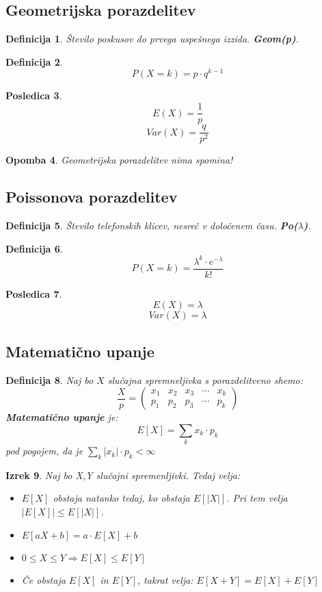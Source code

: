 \documentclass[11pt]{article}
\newtheorem{Izrek}{{\sc Izrek}}[section]
\newtheorem{Posledica}[Izrek]{{\sc Posledica}}
\newtheorem{Definicija}[Izrek]{{\sc Definicija}}
\newtheorem{Opomba}[Izrek]{{\sc Opomba}}
\begin{document}
	\subsection{Geometrijska porazdelitev}
	\begin{Definicija}
		Število poskusov do prvega uspešnega izzida. \textbf{Geom(p)}.
	\end{Definicija}
	\begin{Definicija}
		$$P(X=k) = p \cdot q^{k-1}$$
	\end{Definicija}
	\begin{Posledica}
		$$E(X) = \frac{1}{p}$$
		$$Var(X) = \frac{q}{p^2}$$
	\end{Posledica}
	\begin{Opomba}
		Geometrijska porazdelitev nima spomina!
	\end{Opomba}
	\subsection{Poissonova porazdelitev}
	\begin{Definicija}
		Število telefonskih klicev, nesreč v določenem času. \textbf{Po($\lambda$)}.
	\end{Definicija}
	\begin{Definicija}
		$$P(X=k) = \frac{\lambda^k \cdot e^{-\lambda}}{k!}$$
	\end{Definicija}
	\begin{Posledica}
		$$E(X) = \lambda$$
		$$Var(X) = \lambda$$
	\end{Posledica}
	\subsection{Matematično upanje}
	\begin{Definicija}
		Naj bo $X$ slučajna spremneljivka s porazdelitveno shemo:
		\[
		\frac{X}{p} = \begin{pmatrix}
		x_1 & x_2 & x_3 & \cdots & x_k \\       p_1 & p_2 & p_3 & \cdots & p_k
		\end{pmatrix}
		\]
		\textbf{Matematično upanje} je:
		$$ E[X] = \sum_{k}{x_k \cdot p_k}$$
		pod pogojem, da je $\sum_{k}{|x_k|\cdot p_k} < \infty$
	\end{Definicija}
	\begin{Izrek}
		Naj bo X,Y slučajni spremenljivki. Tedaj velja:
		\begin{itemize}
			\item
			$ E[X]$ obstaja natanko tedaj, ko obstaja $ E[|X|]$. Pri tem velja $|E[X]| \le E[|X|]$.
			\item
			$ E[aX+b] = a \cdot  E[X] + b$
			\item
			$0 \le X \le Y \Rightarrow  E[X] \le  E[Y]$
			\item
			Če obstaja $ E[X]$ in $ E[Y]$, takrat velja: $ E[X+Y] =  E[X] +  E[Y]$ 
		\end{itemize}
	\end{Izrek}
\end{document}

